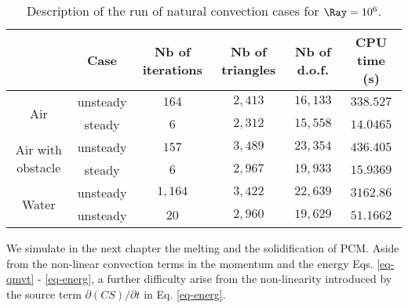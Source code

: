 \begin{table}[!ht]
\centering
\begin{tabular}{*{6}{c}}
  & Case & {\small Nb of iterations} & {\small Nb of triangles} & {\small Nb of d.o.f.} & {\small CPU time (s)}   \\
  \toprule 
  \multirow{2}{*}{Air} & unsteady & $164$ & $2,413$ & $16,133$ & $338.527$ \\
   & steady & $6$ & $2,312$ & $15,558$ & $14.0465$ \\
  \hline
  \multirow{2}{*}{Air with obstacle} & unsteady & $157$ & $3,489$ & $23,354$ & $436.405$ \\
  & steady & $6$ & $2,967$ & $19,933$ & $15.9369$ \\
  \hline
  \multirow{2}{*}{Water} & unsteady & $1,164$ & $3,422$ & $22,639$ & $3162.86$ \\
   & unsteady & $20$ & $2,960$ & $19,629$ & $51.1662$ \\

\bottomrule
 \end{tabular}
\caption{Description of the run of natural convection cases for $\Ray = 10^6$.}
\label{tab-natconv-cases}
\end{table}

We simulate in the next chapter the melting and the solidification of PCM.
Aside from the non-linear convection terms in the momentum and the energy Eqs. \ref{eq-qmvt} - \ref{eq-energ}, a further difficulty arise from the non-linearity introduced by the source term $\partial (CS)/\partial t$ in Eq. \ref{eq-energ}.

